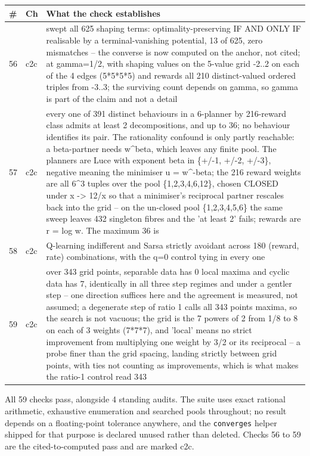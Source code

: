 \par\medskip
\noindent
\begin{tabularx}{\textwidth}{llX}
\toprule
\# & Ch & What the check establishes \\
\midrule
56 & c2c & swept all 625 shaping terms: optimality-preserving IF AND ONLY IF realisable by a terminal-vanishing potential, 13 of 625, zero mismatches -- the converse is now computed on the anchor, not cited; at gamma=1/2, with shaping values on the 5-value grid -2..2 on each of the 4 edges (5*5*5*5) and rewards all 210 distinct-valued ordered triples from -3..3; the surviving count depends on gamma, so gamma is part of the claim and not a detail \\
57 & c2c & every one of 391 distinct behaviours in a 6-planner by 216-reward class admits at least 2 decompositions, and up to 36; no behaviour identifies its pair. The rationality confound is only partly reachable: a beta-partner needs w\textasciicircum{}beta, which leaves any finite pool. The planners are Luce with exponent beta in \{+/-1, +/-2, +/-3\}, negative meaning the minimiser u = w\textasciicircum{}-beta; the 216 reward weights are all 6\textasciicircum{}3 tuples over the pool \{1,2,3,4,6,12\}, chosen CLOSED under x -> 12/x so that a minimiser's reciprocal partner rescales back into the grid -- on the un-closed pool \{1,2,3,4,5,6\} the same sweep leaves 432 singleton fibres and the 'at least 2' fails; rewards are r = log w. The maximum 36 is \\
58 & c2c & Q-learning indifferent and Sarsa strictly avoidant across 180 (reward, rate) combinations, with the q=0 control tying in every one \\
59 & c2c & over 343 grid points, separable data has 0 local maxima and cyclic data has 7, identically in all three step regimes and under a gentler step -- one direction suffices here and the agreement is measured, not assumed; a degenerate step of ratio 1 calls all 343 points maxima, so the search is not vacuous; the grid is the 7 powers of 2 from 1/8 to 8 on each of 3 weights (7*7*7), and 'local' means no strict improvement from multiplying one weight by 3/2 or its reciprocal -- a probe finer than the grid spacing, landing strictly between grid points, with ties not counting as improvements, which is what makes the ratio-1 control read 343 \\
\bottomrule
\end{tabularx}
\par\medskip

All 59 checks pass, alongside 4 standing audits. The suite uses exact rational arithmetic, exhaustive enumeration and searched pools throughout; no result depends on a floating-point tolerance anywhere, and the \texttt{converges} helper shipped for that purpose is declared unused rather than deleted. Checks 56 to 59 are the cited-to-computed pass and are marked c2c.

